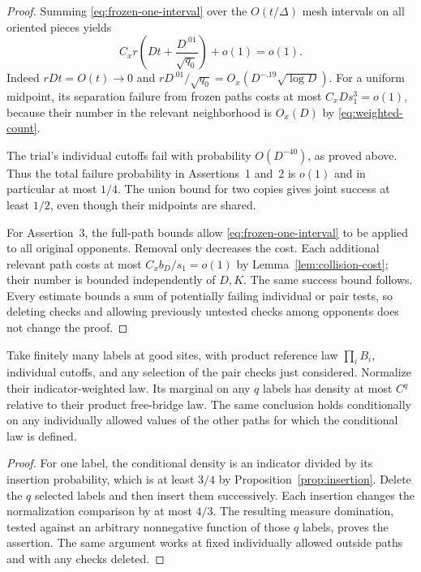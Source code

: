 \begin{proof}
Summing \eqref{eq:frozen-one-interval} over the $O(t/\Delta)$ mesh
intervals on all oriented pieces yields
\begin{equation}\label{eq:frozen-insertion-cost}
 C_xr\left(Dt+\frac{D^{.01}}{\sqrt{q_0}}\right)+o(1)=o(1).
\end{equation}
Indeed $rDt=O(t)\to0$ and
$rD^{.01}/\sqrt{q_0}=O_x(D^{-.19}\sqrt{\log D})$.
For a uniform midpoint, its separation failure from frozen paths
costs at most $C_xDs_1^3=o(1)$, because their number in the relevant
neighborhood is $O_x(D)$ by \eqref{eq:weighted-count}.

The trial's individual cutoffs fail with probability $O(D^{-40})$,
as proved above.  Thus the total failure probability in Assertions~1
and~2 is $o(1)$ and in particular at most $1/4$.  The union bound for
two copies gives joint success at least $1/2$, even though their
midpoints are shared.

For Assertion~3, the full-path bounds allow
\eqref{eq:frozen-one-interval} to be applied to all original opponents.
Removal only decreases the cost.  Each additional relevant path costs
at most $C_xb_D/s_1=o(1)$ by
Lemma~\ref{lem:collision-cost}; their number is bounded independently
of $D,K$.  The same success bound follows.  Every estimate bounds a
sum of potentially failing individual or pair tests, so deleting
checks and allowing previously untested checks among opponents does
not change the proof.
\end{proof}

\begin{corollary}\label{cor:bridge-domination}
Take finitely many labels at good sites, with product reference law
$\prod_iB_i$, individual cutoffs, and any selection of the pair checks
just considered.  Normalize their indicator-weighted law.  Its
marginal on any $q$ labels has density at most $C^q$ relative to their
product free-bridge law.  The same conclusion holds conditionally on
any individually allowed values of the other paths for which the
conditional law is defined.
\end{corollary}

\begin{proof}
For one label, the conditional density is an indicator divided by
its insertion probability, which is at least $3/4$ by
Proposition~\ref{prop:insertion}.  Delete the $q$ selected labels and
then insert them successively.  Each insertion changes the
normalization comparison by at most $4/3$.  The resulting measure
domination, tested against an arbitrary nonnegative function of those
$q$ labels, proves the assertion.  The same argument works at fixed
individually allowed outside paths and with any checks deleted.
\end{proof}

